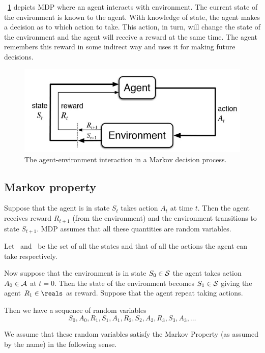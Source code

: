 \figurename~\ref{fig:mdp} depicts MDP where an agent interacts with environment.
The current state of the environment is known to the agent.
With knowledge of state, the agent makes a decision as to which action to take.
This action, in turn, will change the state of the environment and the agent will receive
a reward at the same time.
The agent remembers this reward in some indirect way and uses it for making future decisions.

\begin{figure}
\begin{center}
\includegraphics[width=.7\textwidth]{figures/reinforcement-learning}
\end{center}
\caption{The agent-environment interaction in a Markov decision process.}
\label{fig:mdp}
\end{figure}


\subsection{Markov property}


Suppose that the agent is in state $S_t$ takes action $A_t$ at time $t$.
Then the agent receives reward $R_{t+1}$ (from the environment) and the environment transitions to state $S_{t+1}$.
MDP assumes that all these quantities are random variables.

Let \stateset\ and \actionset\ be the set of all the states and that of all the actions the agent can take respectively.

Now suppose that the environment is in state $S_0\in\mathcal{S}$ the agent takes action $A_0\in\mathcal{A}$ at $t=0$.
Then the state of the environment becomes $S_1\in\mathcal{S}$ giving the agent $R_1\in\reals$ as reward.
Suppose that the agent repeat taking actions.

Then we have a sequence of random variables
\begin{equation}
S_0, A_0,
R_1, S_1, A_1,
R_2, S_2, A_2,
R_3, S_3, A_3,
\ldots
\end{equation}

We assume that these random variables satisfy the Markov Property (as assumed by the name) in the following sense.

